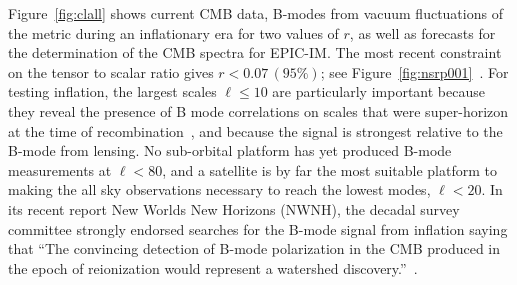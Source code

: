 Figure~\ref{fig:clall} shows current CMB data, B-modes from vacuum fluctuations of the metric during an inflationary 
era for two values of $r$, as well as forecasts for the determination of the \ac{CMB} spectra for EPIC-IM. 
The most recent constraint on the tensor to scalar ratio gives $r < 0.07 \, (95\%)$; see Figure~\ref{fig:nsrp001}~\cite{Array:2015xqh}. 
For testing inflation, 
the largest scales $\ell \leq 10$ are particularly important because they reveal 
the presence of B mode correlations on scales that were super-horizon at the time of recombination~\cite{Lee:2014cya}, 
and because the signal is strongest relative to the B-mode from lensing. No sub-orbital platform
has yet produced B-mode measurements at $\ell< 80$, and a satellite is by far the most suitable 
platform to making the all sky observations necessary to reach the lowest modes, $\ell<20$. 
In its recent report New Worlds New Horizons (NWNH), the decadal survey committee 
strongly endorsed searches for the B-mode signal from inflation saying that ``The convincing detection of 
B-mode polarization in the CMB produced in the epoch of reionization would represent a watershed discovery.''~\cite{blandford2010}. 
\vspace{-0.1in}
